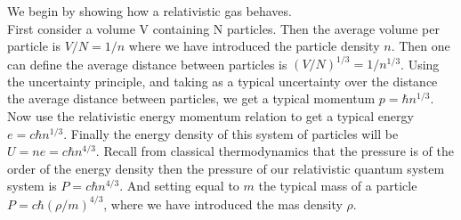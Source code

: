 \documentclass[a4paper,12pt]{article}
\begin{document}
We begin by showing how a relativistic gas behaves.\\

First consider a volume V containing N particles. Then the average
volume per particle is $V/N = 1/n$ where we have introduced the
particle density $n$. Then one can define the average distance between particles
is $(V/N)^{1/3} = 1/n^{1/3}$. Using the uncertainty principle, and taking as a
typical uncertainty over the distance the average distance between
particles, we get a typical momentum $p= \hbar n^{1/3}$. Now use the
relativistic energy momentum relation to get a
typical energy $e= c \hbar n^{1/3}$. Finally the energy density of this system of
particles will be $U= n e = c \hbar n^{4/3}$. Recall from classical
thermodynamics that the pressure is of the order of the energy density
then the pressure of our relativistic quantum system
system is $P= c \hbar n^{4/3}$. And setting equal to $m$ the typical
mass of a particle $P=c \hbar (\rho/m)^{4/3} $, where we have
introduced the mas density $\rho$.
\end{document}
